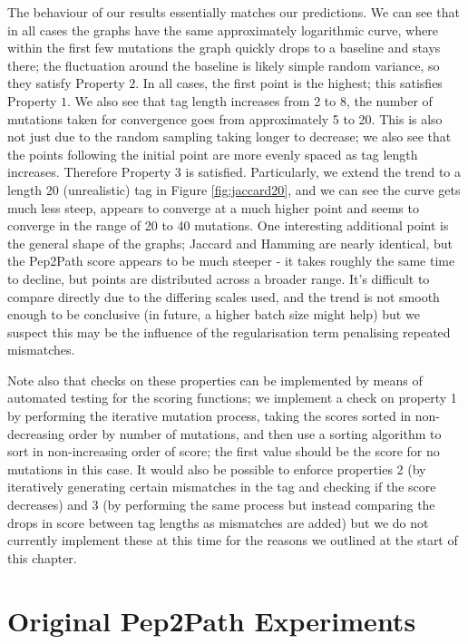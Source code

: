 \documentclass{l4proj}
\begin{document}
The behaviour of our results essentially matches our predictions. We can see that in all cases the graphs have the same approximately logarithmic curve, where within the first few mutations the graph quickly drops to a baseline and stays there; the fluctuation around the baseline is likely simple random variance, so they satisfy Property \(2\). In all cases, the first point is the highest; this satisfies Property \(1\). We also see that tag length increases from 2 to 8, the number of mutations taken for convergence goes from approximately 5 to 20. This is also not just due to the random sampling taking longer to decrease; we also see that the points following the initial point are more evenly spaced as tag length increases. Therefore Property 3 is satisfied. Particularly, we extend the trend to a length 20 (unrealistic) tag in Figure \ref{fig:jaccard20}, and we can see the curve gets much less steep, appears to converge at a much higher point and seems to converge in the range of 20 to 40 mutations. One interesting additional point is the general shape of the graphs; Jaccard and Hamming are nearly identical, but the Pep2Path score appears to be much steeper - it takes roughly the same time to decline, but points are distributed across a broader range. It's difficult to compare directly due to the differing scales used, and the trend is not smooth enough to be conclusive (in future, a higher batch size might help) but we suspect this may be the influence of the regularisation term penalising repeated mismatches.

Note also that checks on these properties can be implemented by means of automated testing for the scoring functions; we implement a check on property 1 by performing the iterative mutation process, taking the scores sorted in non-decreasing order by number of mutations, and then use a sorting algorithm to sort in non-increasing order of score; the first value should be the score for no mutations in this case. It would also be possible to enforce properties 2 (by iteratively generating certain mismatches in the tag and checking if the score decreases) and 3 (by performing the same process but instead comparing the drops in score between tag lengths as mismatches are added) but we do not currently implement these at this time for the reasons we outlined at the start of this chapter.

\section{Original Pep2Path Experiments}
\end{document}
